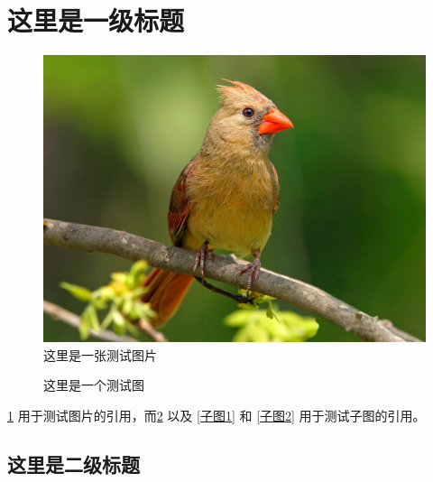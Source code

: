 \documentclass[\main/main.tex]{subfiles}
\begin{document}
\section{这里是一级标题}

\begin{figure}[htb!]
  \centering
  \includegraphics[width = 0.4\linewidth]{figures/test.jpg}
  \caption{这里是一张测试图片}
  \label{这里是一张测试图片}
\end{figure}

\begin{figure}[htb!]
  \centering
  \hspace{0.05\linewidth}
  \caption{这里是一个测试图}
  \label{这里是一个测试图}
\end{figure}

\cref{这里是一张测试图片} 用于测试图片的引用，而\cref{这里是一个测试图} 以及 \cref{子图1} 和 \cref{子图2} 用于测试子图的引用。

\subsection{这里是二级标题}
\end{document}
